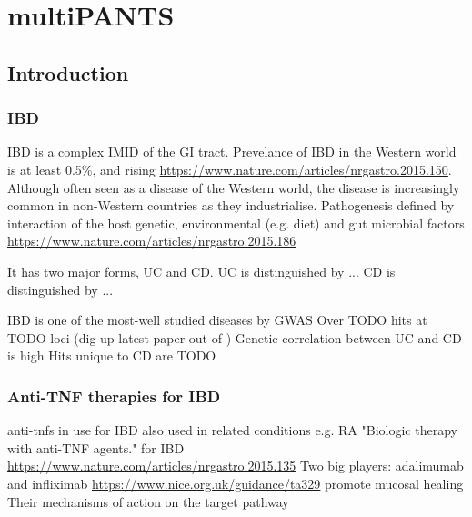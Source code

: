 %
%

\chapter{multiPANTS}


\begin{outline}

\section{Introduction}

\subsection{IBD}

\1 IBD is a complex IMID of the GI tract.
    \2 Prevelance of IBD in the Western world is at least 0.5\%, and rising \url{https://www.nature.com/articles/nrgastro.2015.150}.
    \2 Although often seen as a disease of the Western world, the disease is increasingly common in non-Western countries as they industrialise.
    \2 Pathogenesis defined by interaction of the host genetic, environmental (e.g. diet) and gut microbial factors \url{https://www.nature.com/articles/nrgastro.2015.186}

\1 It has two major forms, UC and CD.
    \1 UC is distinguished by ...
    \2 CD is distinguished by ... \autocite{roda2020CrohnDisease}

\1 IBD is one of the most-well studied diseases by GWAS
    \2 Over TODO hits at TODO loci (dig up latest paper out of \autocite{delange2017GenomewideAssociationStudy,huang2017FinemappingInflammatoryBowel,luo2017ExploringGeneticArchitecture})
    \2 Genetic correlation between UC and CD is high
    \2 Hits unique to CD are TODO

\subsection{Anti-TNF therapies for IBD}

\1 anti-tnfs in use for IBD
    \2 also used in related conditions e.g. RA \autocite{mulhearn2019UsingImmunophenotypePredict}
    \2 "Biologic therapy with anti-TNF agents." for IBD \url{https://www.nature.com/articles/nrgastro.2015.135}
        \3 Two big players: adalimumab and infliximab \autocite{adegbola2018AntiTNFTherapyCrohn}
        \3 \url{https://www.nice.org.uk/guidance/ta329}
        \3 promote mucosal healing
        \3 Their mechanisms of action on the target pathway \autocite{levin2016MechanismActionAntiTNF}


\end{outline}
